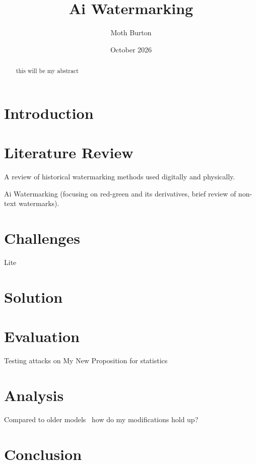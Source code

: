 \documentclass{article}
\title{Ai Watermarking}
\author{Moth Burton}
\date{October 2026}
\begin{document}
\maketitle

\begin{abstract}
    this will be my abstract
\end{abstract}

\section{Introduction}

\section{Literature Review}
A review of historical watermarking methods used digitally and physically.

Ai Watermarking (focusing on red-green and its derivatives, brief review of non-text watermarks).

\section{Challenges}
Lite
\section{Solution}

\section{Evaluation}
Testing attacks on My New Proposition for statistics

\section{Analysis}
Compared to older models~\autocite{ICLR2024_d78e9e43} how do my modifications hold up?

\section{Conclusion}

\printbibliography
\end{document}
